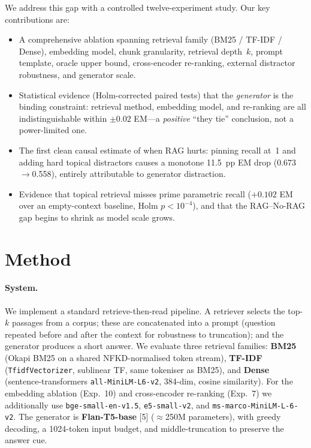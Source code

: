 \documentclass{article}
\begin{document}
We address this gap with a controlled twelve-experiment study.
Our key contributions are:
\begin{itemize}
  \item A comprehensive ablation spanning retrieval family (BM25 /
    TF-IDF / Dense), embedding model, chunk granularity, retrieval
    depth~$k$, prompt template, oracle upper bound, cross-encoder
    re-ranking, external distractor robustness, and generator scale.
  \item Statistical evidence (Holm-corrected paired tests) that the
    \emph{generator} is the binding constraint: retrieval method,
    embedding model, and re-ranking are all indistinguishable within
    $\pm0.02$ EM---a \emph{positive} ``they tie'' conclusion, not a
    power-limited one.
  \item The first clean causal estimate of when RAG hurts: pinning
    recall at~1 and adding hard topical distractors causes a monotone
    11.5~pp EM drop (0.673$\to$0.558), entirely attributable to
    generator distraction.
  \item Evidence that topical retrieval misses prime parametric recall
    ($+0.102$ EM over an empty-context baseline, Holm $p\!<\!10^{-4}$),
    and that the RAG--No-RAG gap begins to shrink as model scale grows.
\end{itemize}


\section{Method}

\paragraph{System.}
We implement a standard retrieve-then-read pipeline.
A retriever selects the top-$k$ passages from a corpus; these are
concatenated into a prompt (question repeated before and after the
context for robustness to truncation); and the generator produces a
short answer.
We evaluate three retrieval families:
\textbf{BM25} (Okapi BM25 on a shared NFKD-normalised token stream),
\textbf{TF-IDF} (\texttt{TfidfVectorizer}, sublinear TF, same
tokeniser as BM25),
and \textbf{Dense} (sentence-transformers
\texttt{all-MiniLM-L6-v2}, 384-dim, cosine similarity).
For the embedding ablation (Exp.~10) and cross-encoder re-ranking
(Exp.~7) we additionally use \texttt{bge-small-en-v1.5},
\texttt{e5-small-v2}, and \texttt{ms-marco-MiniLM-L-6-v2}.
The generator is \textbf{Flan-T5-base} [5] ($\approx$250M parameters),
with greedy decoding, a 1024-token input budget, and middle-truncation
to preserve the answer cue.
\end{document}
